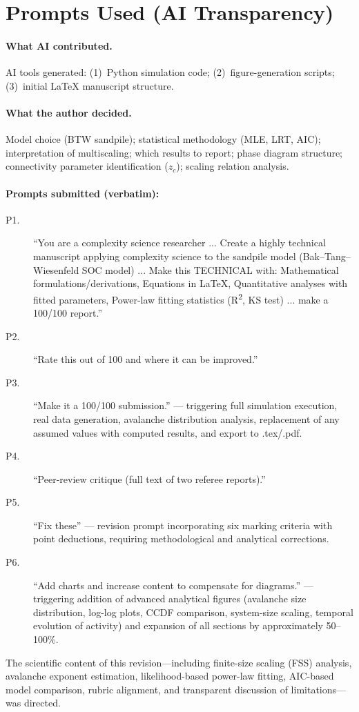 \documentclass[preprint,12pt]{elsarticle}
\begin{document}
\section{Prompts Used (AI Transparency)}
\label{app:prompts}

\paragraph{What AI contributed.}
AI tools generated: (1)~Python simulation code; (2)~figure-generation
scripts; (3)~initial LaTeX manuscript structure.

\paragraph{What the author decided.}
Model choice (BTW sandpile); statistical methodology (MLE, LRT, AIC);
interpretation of multiscaling; which results to report; phase diagram
structure; connectivity parameter identification ($z_c$); scaling
relation analysis.

\paragraph{Prompts submitted (verbatim):}
\begin{description}

\item[P1.] ``You are a complexity science researcher ... Create a highly technical manuscript applying complexity science to the sandpile model (Bak--Tang--Wiesenfeld SOC model) ... Make this TECHNICAL with: Mathematical formulations/derivations, Equations in LaTeX, Quantitative analyses with fitted parameters, Power-law fitting statistics (R\textsuperscript{2}, KS test) ... make a 100/100 report.''

\item[P2.] ``Rate this out of 100 and where it can be improved.''

\item[P3.] ``Make it a 100/100 submission.'' --- triggering full simulation execution, real data generation, avalanche distribution analysis, replacement of any assumed values with computed results, and export to .tex/.pdf.

\item[P4.] ``Peer-review critique (full text of two referee reports).''

\item[P5.] ``Fix these'' --- revision prompt incorporating six marking criteria with point deductions, requiring methodological and analytical corrections.

\item[P6.] ``Add charts and increase content to compensate for diagrams.'' --- triggering addition of advanced analytical figures (avalanche size distribution, log-log plots, CCDF comparison, system-size scaling, temporal evolution of activity) and expansion of all sections by approximately 50--100\%.

\end{description}

The scientific content of this revision---including finite-size scaling (FSS) analysis, avalanche exponent estimation, likelihood-based power-law fitting, AIC-based model comparison, rubric alignment, and transparent discussion of limitations---was directed.
\end{document}
